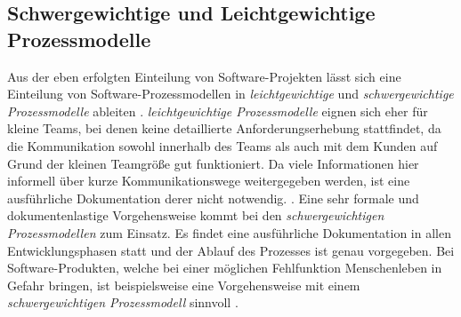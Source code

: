 \subsection{Schwergewichtige und Leichtgewichtige Prozessmodelle}

Aus der eben erfolgten Einteilung von Software-Projekten lässt sich eine Einteilung von Software-Prozessmodellen in \textit{leichtgewichtige} und \textit{schwergewichtige Prozessmodelle} ableiten \cite{Hanser2010}. \newline
\textit{leichtgewichtige Prozessmodelle} eignen sich eher für kleine Teams, bei denen keine detaillierte Anforderungserhebung stattfindet, da die Kommunikation sowohl innerhalb des Teams als auch mit dem Kunden auf Grund der kleinen Teamgröße gut funktioniert. Da viele Informationen hier informell über kurze Kommunikationswege weitergegeben werden, ist eine ausführliche Dokumentation derer nicht notwendig. \cite{Hanser2010}. \newline
Eine sehr formale und dokumentenlastige Vorgehensweise kommt bei den \textit{schwergewichtigen Prozessmodellen} zum Einsatz. Es findet eine ausführliche Dokumentation in allen Entwicklungsphasen statt und der Ablauf des Prozesses ist genau vorgegeben. Bei Software-Produkten, welche bei einer möglichen Fehlfunktion Menschenleben in Gefahr bringen, ist beispielsweise eine Vorgehensweise mit einem \textit{schwergewichtigen Prozessmodell} sinnvoll \cite{Hanser2010}. \newline














